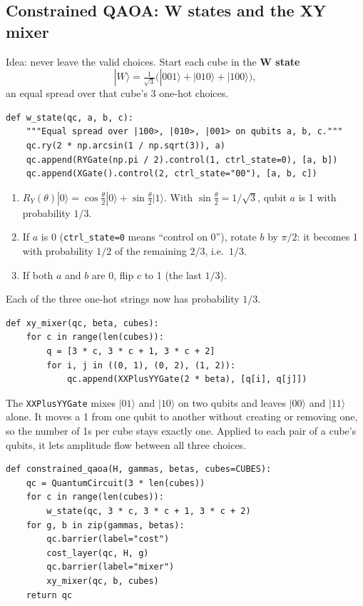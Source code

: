 \documentclass[11pt]{article}
\newcommand{\code}[1]{\texttt{#1}}
\begin{document}
\subsection{Constrained QAOA: W states and the XY mixer}
\label{sec:constrained}

Idea: never leave the valid choices. Start each cube in the \textbf{W state}
\[
|W\rangle = \tfrac{1}{\sqrt3}\big(|001\rangle + |010\rangle + |100\rangle\big),
\]
an equal spread over that cube's 3 one-hot choices.

\begin{lstlisting}
def w_state(qc, a, b, c):
    """Equal spread over |100>, |010>, |001> on qubits a, b, c."""
    qc.ry(2 * np.arcsin(1 / np.sqrt(3)), a)
    qc.append(RYGate(np.pi / 2).control(1, ctrl_state=0), [a, b])
    qc.append(XGate().control(2, ctrl_state="00"), [a, b, c])
\end{lstlisting}

\begin{enumerate}
  \item $R_Y(\theta)|0\rangle = \cos\tfrac\theta2|0\rangle + \sin\tfrac\theta2|1\rangle$.
        With $\sin\tfrac\theta2 = 1/\sqrt3$, qubit $a$ is 1 with probability $1/3$.
  \item If $a$ is 0 (\code{ctrl\_state=0} means ``control on 0''), rotate $b$ by
        $\pi/2$: it becomes 1 with probability $1/2$ of the remaining $2/3$,
        i.e.\ $1/3$.
  \item If both $a$ and $b$ are 0, flip $c$ to 1 (the last $1/3$).
\end{enumerate}
Each of the three one-hot strings now has probability $1/3$.

\begin{lstlisting}
def xy_mixer(qc, beta, cubes):
    for c in range(len(cubes)):
        q = [3 * c, 3 * c + 1, 3 * c + 2]
        for i, j in ((0, 1), (0, 2), (1, 2)):
            qc.append(XXPlusYYGate(2 * beta), [q[i], q[j]])
\end{lstlisting}

The \code{XXPlusYYGate} mixes $|01\rangle$ and $|10\rangle$ on two qubits and
leaves $|00\rangle$ and $|11\rangle$ alone. It moves a 1 from one qubit to
another without creating or removing one, so the number of 1s per cube stays
exactly one. Applied to each pair of a cube's qubits, it lets amplitude flow
between all three choices.

\begin{lstlisting}
def constrained_qaoa(H, gammas, betas, cubes=CUBES):
    qc = QuantumCircuit(3 * len(cubes))
    for c in range(len(cubes)):
        w_state(qc, 3 * c, 3 * c + 1, 3 * c + 2)
    for g, b in zip(gammas, betas):
        qc.barrier(label="cost")
        cost_layer(qc, H, g)
        qc.barrier(label="mixer")
        xy_mixer(qc, b, cubes)
    return qc
\end{lstlisting}
\end{document}
